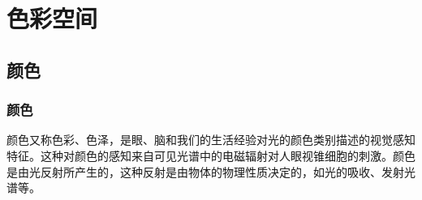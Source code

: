 \documentclass[8pt, aspectratio=169]{ctexbeamer}
\begin{document}








\section{色彩空间}

\subsection{颜色}

\begin{frame}
	\frametitle{颜色}

	颜色又称色彩、色泽，是眼、脑和我们的生活经验对光的颜色类别描述的视觉感知特征。这种对颜色的感知来自可见光谱中的电磁辐射对人眼视锥细胞的刺激。颜色是由光反射所产生的，这种反射是由物体的物理性质决定的，如光的吸收、发射光谱等。
\end{frame}
\end{document}
